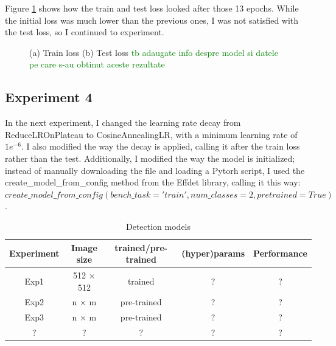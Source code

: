 Figure \ref{fig:fig27} shows how the train and test loss looked after those 13 epochs. 
While the initial loss was much lower than the previous ones, I was not satisfied with the test loss, so I continued to experiment.

\begin{figure}[!ht]
    \label{fig:fig27}
    \caption{(a) Train loss (b) Test loss
    \textcolor{green}{tb adaugate info despre model si datele pe care s-au obtinut aceste rezultate}
    }
\end{figure}

\subsection{Experiment 4}

In the next experiment, I changed the learning rate decay from ReduceLROnPlateau to CosineAnnealingLR, with a minimum learning rate of \(1e^{-6}\). I also modified the way the decay is applied, calling it after the train loss rather than the test. Additionally, I modified the way the model is initialized; instead of manually downloading the file and loading a Pytorh script, I used the create\_model\_from\_config method from the Effdet library, calling it this way: \(create\_model\_from\_config(bench\_task='train', num\_classes=2, pretrained=True)\).  


\begin{table}[!ht]
    \centering
    \begin{tabular}{|c|c|c|c|c|}
        \hline
        Experiment & Image size & trained/pre-trained & (hyper)params & Performance \\
        \hline\hline
        Exp1 & 512 $\times$ 512 & trained & ? & ?\\
        \hline
        Exp2 & n $\times$ m & pre-trained & ? & ?\\
        \hline
        Exp3 & n $\times$ m & pre-trained & ? & ?\\
        \hline
        ? & ? & ? & ? & ?\\
        \hline    
    \end{tabular}
    \caption{Detection models}
    \label{tab:detectionModels}
\end{table}